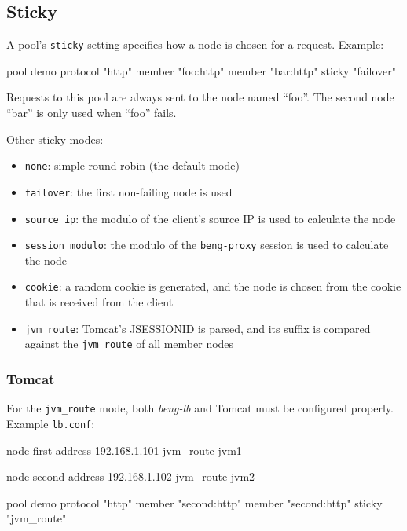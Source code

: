 \documentclass[a4paper,12pt]{article}
\begin{document}
\subsection{Sticky}
\label{sticky}

A pool's \verb|sticky| setting specifies how a node is chosen for a
request.  Example:

\begin{verbatim*}
pool demo {
  protocol "http"
  member "foo:http"
  member "bar:http"
  sticky "failover"
}
\end{verbatim*}

Requests to this pool are always sent to the node named ``foo''.  The
second node ``bar'' is only used when ``foo'' fails.

Other sticky modes:

\begin{itemize}
\item \texttt{none}: simple round-robin (the default mode)
\item \texttt{failover}: the first non-failing node is used
\item \verb|source_ip|: the modulo of the client's source IP is used
  to calculate the node
\item \texttt{session\_modulo}: the modulo of the \texttt{beng-proxy}
  session is used to calculate the node
\item \texttt{cookie}: a random cookie is generated, and the node is
  chosen from the cookie that is received from the client
\item \verb|jvm_route|: Tomcat's JSESSIONID is parsed, and its suffix
  is compared against the \verb|jvm_route| of all member nodes
\end{itemize}

\subsubsection{Tomcat}

For the \verb|jvm_route| mode, both \emph{beng-lb} and Tomcat must be
configured properly.  Example \texttt{lb.conf}:

\begin{verbatim*}
node first {
   address 192.168.1.101
   jvm_route jvm1
}

node second {
   address 192.168.1.102
   jvm_route jvm2
}

pool demo {
  protocol "http"
  member "second:http"
  member "second:http"
  sticky "jvm_route"
}
\end{verbatim*}
\end{document}
